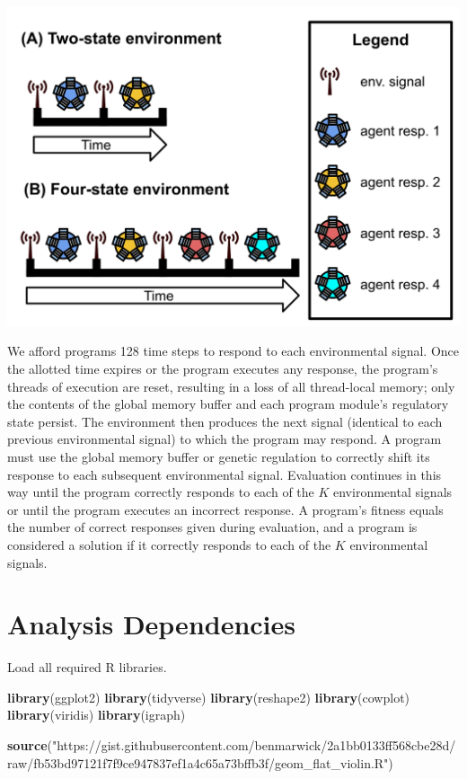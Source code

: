 \documentclass[
]{book}
\newenvironment{Shaded}{\begin{snugshade}}{\end{snugshade}}
\newcommand{\KeywordTok}[1]{\textcolor[rgb]{0.13,0.29,0.53}{\textbf{#1}}}
\newcommand{\NormalTok}[1]{#1}
\newcommand{\StringTok}[1]{\textcolor[rgb]{0.31,0.60,0.02}{#1}}
\begin{document}
\includegraphics{experiments/2020-11-25-rep-sig/analysis/../../../media/repeated-signal-task.png}

We afford programs 128 time steps to respond to each environmental signal.
Once the allotted time expires or the program executes any response, the program's threads of execution are reset, resulting in a loss of all thread-local memory; only the contents of the global memory buffer and each program module's regulatory state persist.
The environment then produces the next signal (identical to each previous environmental signal) to which the program may respond.
A program must use the global memory buffer or genetic regulation to correctly shift its response to each subsequent environmental signal.
Evaluation continues in this way until the program correctly responds to each of the \(K\) environmental signals or until the program executes an incorrect response.
A program's fitness equals the number of correct responses given during evaluation, and a program is considered a solution if it correctly responds to each of the \(K\) environmental signals.

\hypertarget{analysis-dependencies-1}{%
\section{Analysis Dependencies}\label{analysis-dependencies-1}}

Load all required R libraries.

\begin{Shaded}
\begin{Highlighting}[]
\KeywordTok{library}\NormalTok{(ggplot2)}
\KeywordTok{library}\NormalTok{(tidyverse)}
\KeywordTok{library}\NormalTok{(reshape2)}
\KeywordTok{library}\NormalTok{(cowplot)}
\KeywordTok{library}\NormalTok{(viridis)}
\KeywordTok{library}\NormalTok{(igraph)}

\KeywordTok{source}\NormalTok{(}\StringTok{"https://gist.githubusercontent.com/benmarwick/2a1bb0133ff568cbe28d/raw/fb53bd97121f7f9ce947837ef1a4c65a73bffb3f/geom\_flat\_violin.R"}\NormalTok{)}
\end{Highlighting}
\end{Shaded}
\end{document}
